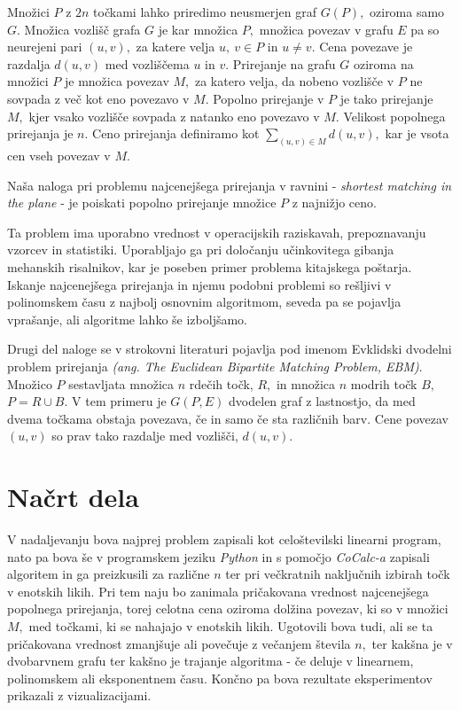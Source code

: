\documentclass[a4paper, 11pt]{article}
\begin{document}
Množici $P$ z $2n$ točkami lahko priredimo neusmerjen graf $G(P),$ oziroma samo $G.$
Množica vozlišč grafa $G$ je kar množica $P,$ množica povezav v grafu $E$ pa so neurejeni pari $(u,v),$
za katere velja $u,~v \in P$ in $u \neq v.$ 
Cena povezave je razdalja $d(u,v)$ med vozliščema $u$ in $v.$
Prirejanje na grafu $G$ oziroma na množici $P$ je množica povezav $M,$ 
za katero velja, da nobeno vozlišče v $P$ ne sovpada z več kot eno povezavo v $M.$
Popolno prirejanje v $P$ je tako prirejanje $M,$ kjer vsako vozlišče sovpada z natanko eno povezavo v $M.$
Velikost popolnega prirejanja je $n.$ 
Ceno prirejanja definiramo kot $\sum_{(u,v) \in M} d(u,v),$ kar je vsota cen vseh povezav v $M.$

Naša naloga pri problemu najcenejšega prirejanja v ravnini - \textit{shortest matching in the plane} - je poiskati
popolno prirejanje množice $P$ z najnižjo ceno.

Ta problem ima uporabno vrednost v operacijskih raziskavah, prepoznavanju vzorcev in statistiki.
Uporabljajo ga pri določanju učinkovitega gibanja mehanskih risalnikov, kar je poseben primer problema kitajskega poštarja.
Iskanje najcenejšega prirejanja in njemu podobni problemi so rešljivi v polinomskem času z najbolj osnovnim algoritmom, 
seveda pa se pojavlja vprašanje, ali algoritme lahko še izboljšamo.

Drugi del naloge se v strokovni literaturi pojavlja pod imenom Evklidski dvodelni problem prirejanja \emph{(ang. The Euclidean Bipartite Matching Problem, EBM)}.
Množico $P$ sestavljata množica $n$ rdečih točk, $R,$ in množica $n$ modrih točk $B,$ $P=R \cup B.$
V tem primeru je $G(P,E)$ dvodelen graf z lastnostjo, da med dvema točkama obstaja povezava, če in samo če sta različnih barv.
Cene povezav $(u,v)$ so prav tako razdalje med vozlišči, $d(u,v).$

\section{Načrt dela}
V nadaljevanju bova najprej problem zapisali kot celoštevilski linearni program, nato pa bova še v programskem jeziku \textit{Python} in s pomočjo \textit{CoCalc-a} zapisali algoritem in ga preizkusili za različne $n$ ter pri večkratnih naključnih izbirah točk v enotskih likih.
Pri tem naju bo zanimala pričakovana vrednost najcenejšega popolnega prirejanja, torej celotna cena oziroma dolžina povezav, ki so v množici $M,$ med točkami, ki se nahajajo v enotskih likih.
Ugotovili bova tudi, ali se ta pričakovana vrednost zmanjšuje ali povečuje z večanjem števila $n,$ ter kakšna je v dvobarvnem grafu ter kakšno je trajanje algoritma - če deluje v linearnem, polinomskem ali eksponentnem času.
Končno pa bova rezultate eksperimentov prikazali z vizualizacijami.
\end{document}

